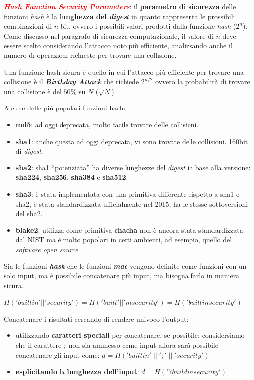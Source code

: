 \begin{flushleft}
    \textcolor{red}{\textbf{\textit{Hash Function Security Parameters}}}: il \textbf{parametro di sicurezza} delle funzioni \textit{hash} è la \textbf{lunghezza del \textit{digest}} in quanto rappresenta le prossibili combinazioni di $n$ bit, ovvero i possibili valori prodotti dalla funzione \textit{hash} ($2^n$). Come discusso nel paragrafo di sicurezza computazionale, il valore di $n$ deve essere scelto considerando l'attacco noto più efficiente, analizzando anche il numero di operazioni richieste per trovare una collisione. 

    \smallskip

    Una funzione hash sicura è quello in cui l'attacco più efficiente per trovare una collisione è il \textbf{\textit{Birthday Attack}} che richiede $2^{n/2}$ ovvero la probabilità di trovare una collisione è del $50\%$ su $N$ ($\sqrt{N}$)

    \medskip

    Alcune delle più popolari funzioni hash:
    \begin{itemize}[nosep]
        \item \textbf{md5}: ad oggi deprecata, molto facile trovare delle collisioni.
        \item \textbf{sha1}: anche questa ad oggi deprecata, vi sono trovate delle collisioni. 160bit di \textit{digest}.
        \item \textbf{sha2}: sha1 ``potenziata'' ha diverse lunghezze del \textit{digest} in base alla versione: \textbf{sha224}, \textbf{sha256}, \textbf{sha384} e \textbf{sha512}.
        \item \textbf{sha3}: è stata implementata con una primitiva differente rispetto a sha1 e sha2, è stata standardizzata ufficialmente nel 2015, ha le stesse sottoversioni del sha2.
        \item \textbf{blake2}: utilizza come primitiva \textbf{chacha} non è ancora stata standardizzata dal NIST ma è molto popolari in certi ambienti, ad esempio, quello del \textit{software open source}.
    \end{itemize}

    Sia le funzioni \textbf{\textit{hash}} che le funzioni \textbf{\textit{mac}} vengono definite come funzioni con un solo input, ma è possibile concatenare più input, ma bisogna farlo in maniera sicura.

    {\centering
        $H('builtin' || 'security') = H('built' || 'insecurity') = H('builtinsecurity')$
    \par}

    Concatenare i risultati cercando di rendere univoco l'output:
    \begin{itemize}[nosep]
        \item utilizzando \textbf{caratteri speciali} per concatenare, se possibile: considersiamo che il carattere $;$ non sia ammesso come input allora sarà possibile concatenare gli input come: $d = H('builtin' \; || \; ';' \; || \; 'security')$
        \item \textbf{esplicitando} la \textbf{lunghezza dell'input}: $d = H('7buildinsecurity')$ 
    \end{itemize}
\end{flushleft}

